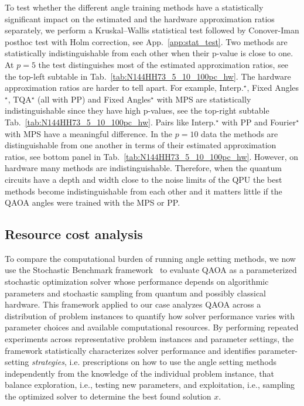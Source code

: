 \documentclass[twocolumn,
english,
aps,
pra,
10pt,
longbibliography,
superscriptaddress,
amsmath,
amssymb,
floatfix
]{revtex4-2}
\begin{document}
{To test whether the different angle training methods have a statistically significant impact on the estimated and the hardware approximation ratios separately, we perform a Kruskal–Wallis statistical test followed by Conover-Iman posthoc test with Holm correction, see App.~\ref{app:stat_test}.
Two methods are statistically indistinguishable from each other when their p-value is close to one.
At $p=5$ the test distinguishes most of the estimated approximation ratios, see the top-left subtable in Tab.~\ref{tab:N144HH73_5_10_100pc_hw}.
The hardware approximation ratios are harder to tell apart.
For example, Interp.$^\star$, Fixed Angles$^\star$, TQA$^\star$ (all with PP) and Fixed Angles$^\star$ with MPS are statistically indistinguishable since they have high p-values, see the top-right subtable Tab.~\ref{tab:N144HH73_5_10_100pc_hw}.
Pairs like Interp.$^\star$ with PP and Fourier$^\star$ with MPS have a meaningful difference.
In the $p=10$ data the methods are distinguishable from one another in terms of their estimated approximation ratios, see bottom panel in Tab.~\ref{tab:N144HH73_5_10_100pc_hw}.
However, on hardware many methods are indistinguishable.
Therefore, when the quantum circuits have a depth and width close to the noise limits of the QPU the best methods become indistinguishable from each other and it matters little if the QAOA angles were trained with the MPS or PP.





\subsection{Resource cost analysis\label{sec:results_ressources}}

To compare the computational burden of running angle setting methods, we now use the Stochastic Benchmark framework~\cite{Neira2024} to evaluate QAOA as a parameterized stochastic optimization solver whose performance depends on algorithmic parameters and stochastic sampling from quantum and possibly classical hardware.
This framework applied to our case analyzes QAOA across a distribution of problem instances to quantify how solver performance varies with parameter choices and available computational resources.
By performing repeated experiments across representative problem instances and parameter settings, the framework statistically characterizes solver performance and identifies parameter-setting \emph{strategies}, i.e. prescriptions on how to use the angle setting methods independently from the knowledge of the individual problem instance, that balance exploration, i.e., testing new parameters, and exploitation, i.e., sampling the optimized solver to determine the best found solution $x$.

}
\end{document}
